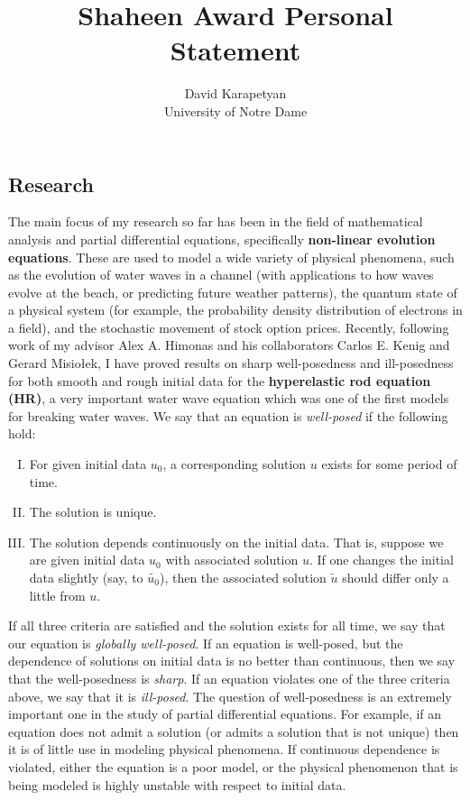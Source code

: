 \documentclass[12pt,reqno]{article}
\begin{document}
\title{Shaheen Award Personal Statement} 
\author{{David Karapetyan}\\
    \/ University of Notre Dame}
    \date{}
\maketitle
%
%
\thispagestyle{empty}
\subsection{Research} 
\label{ssec:cur-res}
The main focus of my research so far has been in the field of mathematical analysis and partial differential equations, specifically \textbf{non-linear evolution equations}. These are used to model a wide variety of physical phenomena, such as the evolution of water waves in a channel (with applications to how waves evolve at the beach, or predicting future weather patterns), the quantum state of a physical system (for example, the probability density distribution of electrons in a field), and the stochastic movement of stock option prices. Recently, following work of my advisor Alex A. Himonas and his collaborators Carlos E. Kenig and Gerard Misio{\l}ek, I have proved results on sharp well-posedness and ill-posedness
for both smooth and rough initial data for the \textbf{hyperelastic rod equation (HR)}, a very important water wave equation which was one of the first models for breaking water waves. We say that an equation is \textit{well-posed} if the following hold:
\begin{enumerate}[I.]
  \item{}For given initial data $u_{0}$, a corresponding solution $u$ exists
    for some period of time.
  \item{} The solution is unique.
  \item{} The solution depends continuously on the initial data. That is, suppose we are given initial data $u_{0}$ with associated solution $u$. If one changes the initial data slightly (say, to $\tilde{u_{0}}$), then the associated solution $\tilde{u}$ should differ only a little from $u$. 
\end{enumerate}
If all three criteria are satisfied and the solution exists for all time, we say that our equation is \textit{globally well-posed}. If an equation is well-posed, but the dependence of solutions on initial data is no better than continuous, then we say that the well-posedness is \textit{sharp}. If an equation violates one of the three criteria above, we say that it is \textit{ill-posed}. The question of well-posedness is an extremely important one in the study of partial differential equations. For example, if an equation does not admit a solution (or admits a solution that is not unique) then it is of little use in modeling physical phenomena. If continuous dependence is violated, either the equation is a poor model, or the physical phenomenon that is being modeled is highly unstable with respect to initial data.
\end{document}
